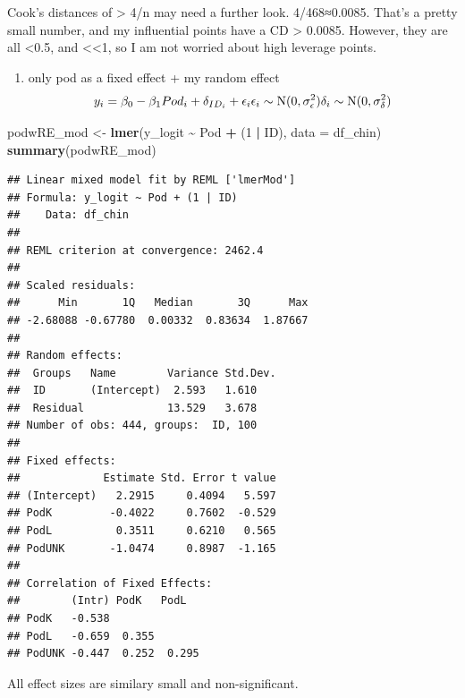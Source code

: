 \documentclass[
]{article}
\newenvironment{Shaded}{\begin{snugshade}}{\end{snugshade}}
\newcommand{\AttributeTok}[1]{\textcolor[rgb]{0.13,0.29,0.53}{#1}}
\newcommand{\DecValTok}[1]{\textcolor[rgb]{0.00,0.00,0.81}{#1}}
\newcommand{\FunctionTok}[1]{\textcolor[rgb]{0.13,0.29,0.53}{\textbf{#1}}}
\newcommand{\NormalTok}[1]{#1}
\newcommand{\OtherTok}[1]{\textcolor[rgb]{0.56,0.35,0.01}{#1}}
\newcommand{\SpecialCharTok}[1]{\textcolor[rgb]{0.81,0.36,0.00}{\textbf{#1}}}
\providecommand{\tightlist}{%
  \setlength{\itemsep}{0pt}\setlength{\parskip}{0pt}}
\begin{document}
Cook's distances of \textgreater{} 4/n may need a further look.
4/468≈0.0085. That's a pretty small number, and my influential points
have a CD \textgreater{} 0.0085. However, they are all \textless0.5, and
\textless\textless1, so I am not worried about high leverage points.

\begin{enumerate}
\def\labelenumi{\arabic{enumi}.}
\setcounter{enumi}{1}
\tightlist
\item
  only pod as a fixed effect + my random effect \[
  y_i = \beta_0 - \beta_1 Pod_i + \delta_{ID_i}+ \epsilon_i \\
  \epsilon_i \sim \text{N}(0, \sigma_\epsilon^2) \\
  \delta_{i} \sim \text{N}(0, \sigma_\delta^2) \\
  \]
\end{enumerate}

\begin{Shaded}
\begin{Highlighting}[]
\NormalTok{podwRE\_mod }\OtherTok{\textless{}{-}} \FunctionTok{lmer}\NormalTok{(y\_logit }\SpecialCharTok{\textasciitilde{}}\NormalTok{ Pod }\SpecialCharTok{+}\NormalTok{ (}\DecValTok{1} \SpecialCharTok{|}\NormalTok{ ID), }\AttributeTok{data =}\NormalTok{ df\_chin)}
\FunctionTok{summary}\NormalTok{(podwRE\_mod)}
\end{Highlighting}
\end{Shaded}

\begin{verbatim}
## Linear mixed model fit by REML ['lmerMod']
## Formula: y_logit ~ Pod + (1 | ID)
##    Data: df_chin
## 
## REML criterion at convergence: 2462.4
## 
## Scaled residuals: 
##      Min       1Q   Median       3Q      Max 
## -2.68088 -0.67780  0.00332  0.83634  1.87667 
## 
## Random effects:
##  Groups   Name        Variance Std.Dev.
##  ID       (Intercept)  2.593   1.610   
##  Residual             13.529   3.678   
## Number of obs: 444, groups:  ID, 100
## 
## Fixed effects:
##             Estimate Std. Error t value
## (Intercept)   2.2915     0.4094   5.597
## PodK         -0.4022     0.7602  -0.529
## PodL          0.3511     0.6210   0.565
## PodUNK       -1.0474     0.8987  -1.165
## 
## Correlation of Fixed Effects:
##        (Intr) PodK   PodL  
## PodK   -0.538              
## PodL   -0.659  0.355       
## PodUNK -0.447  0.252  0.295
\end{verbatim}

All effect sizes are similary small and non-significant.
\end{document}
